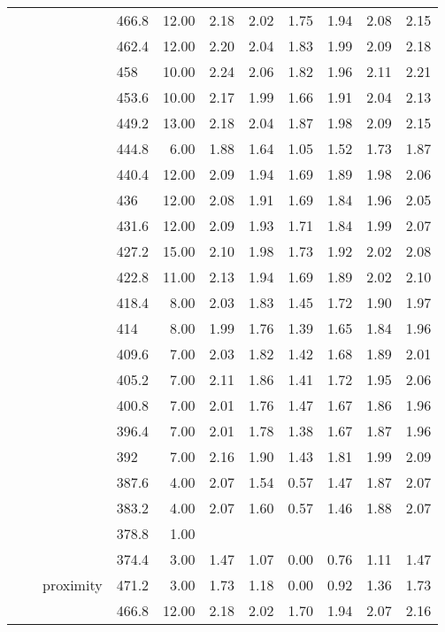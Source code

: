 \begin{longtable}{llllrrrrrrr}
   &  &  & 466.8 & 12.00 & 2.18 & 2.02 & 1.75 & 1.94 & 2.08 & 2.15 \\ 
   &  &  & 462.4 & 12.00 & 2.20 & 2.04 & 1.83 & 1.99 & 2.09 & 2.18 \\ 
   &  &  & 458 & 10.00 & 2.24 & 2.06 & 1.82 & 1.96 & 2.11 & 2.21 \\ 
   &  &  & 453.6 & 10.00 & 2.17 & 1.99 & 1.66 & 1.91 & 2.04 & 2.13 \\ 
   &  &  & 449.2 & 13.00 & 2.18 & 2.04 & 1.87 & 1.98 & 2.09 & 2.15 \\ 
   &  &  & 444.8 & 6.00 & 1.88 & 1.64 & 1.05 & 1.52 & 1.73 & 1.87 \\ 
   &  &  & 440.4 & 12.00 & 2.09 & 1.94 & 1.69 & 1.89 & 1.98 & 2.06 \\ 
   &  &  & 436 & 12.00 & 2.08 & 1.91 & 1.69 & 1.84 & 1.96 & 2.05 \\ 
   &  &  & 431.6 & 12.00 & 2.09 & 1.93 & 1.71 & 1.84 & 1.99 & 2.07 \\ 
   &  &  & 427.2 & 15.00 & 2.10 & 1.98 & 1.73 & 1.92 & 2.02 & 2.08 \\ 
   &  &  & 422.8 & 11.00 & 2.13 & 1.94 & 1.69 & 1.89 & 2.02 & 2.10 \\ 
   &  &  & 418.4 & 8.00 & 2.03 & 1.83 & 1.45 & 1.72 & 1.90 & 1.97 \\ 
   &  &  & 414 & 8.00 & 1.99 & 1.76 & 1.39 & 1.65 & 1.84 & 1.96 \\ 
   &  &  & 409.6 & 7.00 & 2.03 & 1.82 & 1.42 & 1.68 & 1.89 & 2.01 \\ 
   &  &  & 405.2 & 7.00 & 2.11 & 1.86 & 1.41 & 1.72 & 1.95 & 2.06 \\ 
   &  &  & 400.8 & 7.00 & 2.01 & 1.76 & 1.47 & 1.67 & 1.86 & 1.96 \\ 
   &  &  & 396.4 & 7.00 & 2.01 & 1.78 & 1.38 & 1.67 & 1.87 & 1.96 \\ 
   &  &  & 392 & 7.00 & 2.16 & 1.90 & 1.43 & 1.81 & 1.99 & 2.09 \\ 
   &  &  & 387.6 & 4.00 & 2.07 & 1.54 & 0.57 & 1.47 & 1.87 & 2.07 \\ 
   &  &  & 383.2 & 4.00 & 2.07 & 1.60 & 0.57 & 1.46 & 1.88 & 2.07 \\ 
   &  &  & 378.8 & 1.00 &  &  &  &  &  &  \\ 
   &  &  & 374.4 & 3.00 & 1.47 & 1.07 & 0.00 & 0.76 & 1.11 & 1.47 \\ 
   &  & proximity & 471.2 & 3.00 & 1.73 & 1.18 & 0.00 & 0.92 & 1.36 & 1.73 \\ 
   &  &  & 466.8 & 12.00 & 2.18 & 2.02 & 1.70 & 1.94 & 2.07 & 2.16 \\ 

\end{longtable}
